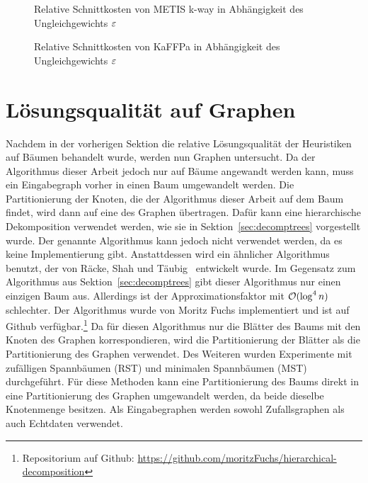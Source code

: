 \begin{figure}[H]
    \centering
    
    \caption{Relative Schnittkosten von METIS k-way in Abhängigkeit des Ungleichgewichts $\varepsilon$\label{fig:mkwaytreesimb}}
\end{figure}

\begin{figure}[H]
    \centering
    
    \caption{Relative Schnittkosten von KaFFPa in Abhängigkeit des Ungleichgewichts $\varepsilon$\label{fig:kaffpatreesimb}}
\end{figure}

\section{Lösungsqualität auf Graphen}
Nachdem in der vorherigen Sektion die relative Lösungsqualität der Heuristiken auf Bäumen behandelt wurde, werden nun Graphen untersucht.
Da der Algorithmus dieser Arbeit jedoch nur auf Bäume angewandt werden kann, muss ein Eingabegraph vorher in einen Baum umgewandelt werden.
Die Partitionierung der Knoten, die der Algorithmus dieser Arbeit auf dem Baum findet, wird dann auf eine des Graphen übertragen.
Dafür kann eine hierarchische Dekomposition verwendet werden, wie sie in Sektion~\ref{sec:decomptrees} vorgestellt wurde.
Der genannte Algorithmus kann jedoch nicht verwendet werden, da es keine Implementierung gibt.
Anstattdessen wird ein ähnlicher Algorithmus benutzt, der von Räcke, Shah und Täubig~\cite{RST14} entwickelt wurde.
Im Gegensatz zum Algorithmus aus Sektion~\ref{sec:decomptrees} gibt dieser Algorithmus nur einen einzigen Baum aus.
Allerdings ist der Approximationsfaktor mit $\mathcal{O}(\log^4 n)$ schlechter.
Der Algorithmus wurde von Moritz Fuchs implementiert und ist auf Github verfügbar.\footnote{Repositorium auf Github: \url{https://github.com/moritzFuchs/hierarchical-decomposition}}
Da für diesen Algorithmus nur die Blätter des Baums mit den Knoten des Graphen korrespondieren, wird die Partitionierung der Blätter als die Partitionierung des Graphen verwendet.
Des Weiteren wurden Experimente mit zufälligen Spannbäumen (RST) und minimalen Spannbäumen (MST) durchgeführt.
Für diese Methoden kann eine Partitionierung des Baums direkt in eine Partitionierung des Graphen umgewandelt werden, da beide dieselbe Knotenmenge besitzen.
Als Eingabegraphen werden sowohl Zufallsgraphen als auch Echtdaten verwendet.

